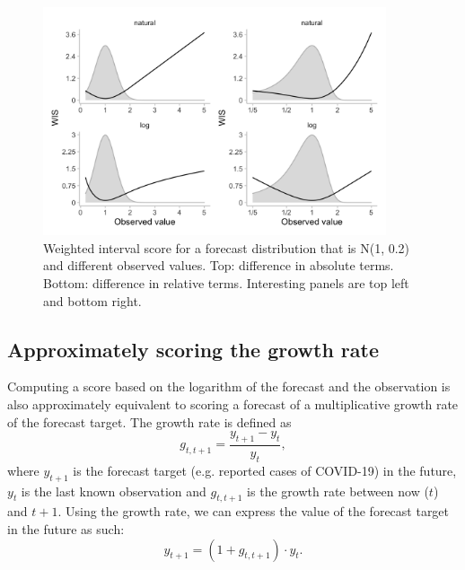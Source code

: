 \documentclass{article}
\begin{document}
\begin{figure}[h!]
    \centering
    \includegraphics[width=0.9\textwidth]{output/figures/SIM-effect-log-score.png}
    \caption{Weighted interval score for a forecast distribution that is N(1, 0.2) and different observed values. Top: difference in absolute terms. Bottom: difference in relative terms. Interesting panels are top left and bottom right.} 
    \label{fig:change-in-scores}
\end{figure}

\subsection{Approximately scoring the growth rate}
Computing a score based on the logarithm of the forecast and the observation is also approximately equivalent to scoring a forecast of a multiplicative growth rate of the forecast target. The growth rate is defined as
%
\begin{equation}
    g_{t, t+1} = \frac{y_{t+1} - y_t}{y_t},
\end{equation}
%
where $y_{t+1}$ is the forecast target (e.g. reported cases of COVID-19) in the future, $y_t$ is the last known observation and $g_{t, t+1}$ is the growth rate between now ($t$) and $t+1$. 
Using the growth rate, we can express the value of the forecast target in the future as such: 
%
\begin{equation}
y_{t+1} = (1 + g_{t, t+1}) \cdot y_t.
\end{equation}
%
\end{document}
